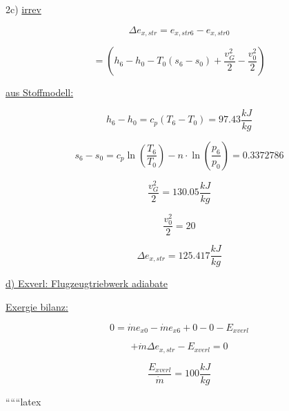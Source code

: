 2c) \underline{irrev}

\[
\Delta e_{x,str} = e_{x,str6} - e_{x,str0}
\]

\[
= \left( h_6 - h_0 - T_0 (s_6 - s_0) + \frac{v_{G}^2}{2} - \frac{v_{0}^2}{2} \right)
\]

\underline{aus Stoffmodell:}

\[
h_6 - h_0 = c_p \left( T_6 - T_0 \right) = 97.43 \frac{kJ}{kg}
\]

\[
s_6 - s_0 = c_p \ln \left( \frac{T_6}{T_0} \right) - n \cdot \ln \left( \frac{p_6}{p_0} \right) = 0.3372786
\]

\[
\frac{v_{G}^2}{2} = 130.05 \frac{kJ}{kg}
\]

\[
\frac{v_{0}^2}{2} = 20
\]

\[
\Delta e_{x,str} = 125.417 \frac{kJ}{kg}
\]

\underline{d) Exverl: Flugzeugtriebwerk adiabate}

\underline{Exergie bilanz:}

\[
0 = \dot{m} e_{x0} - \dot{m} e_{x6} + 0 - 0 - E_{xverl}
\]

\[
+ \dot{m} \Delta e_{x,str} - E_{xverl} = 0
\]

\[
\frac{E_{xverl}}{\dot{m}} = 100 \frac{kJ}{kg}
\]

``````latex